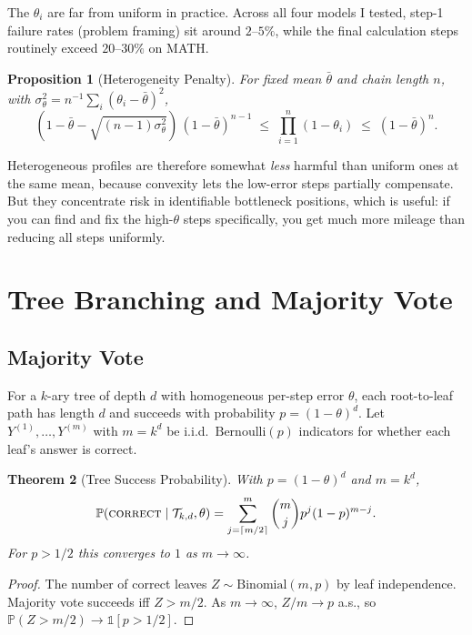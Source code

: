 \documentclass[11pt]{article}
\theoremstyle{plain}
\newtheorem{theorem}{Theorem}[section]
\newtheorem{proposition}[theorem]{Proposition}
\theoremstyle{definition}
\newcommand{\Prob}{\mathbb{P}}
\newcommand{\tree}{\mathcal{T}}
\newcommand{\correct}{\textsc{correct}}
\begin{document}
The $\theta_i$ are far from uniform in practice. Across all four models I
tested, step-1 failure rates (problem framing) sit around $2$--$5\%$, while
the final calculation steps routinely exceed $20$--$30\%$ on MATH.

\begin{proposition}[Heterogeneity Penalty]\label{prop:hetero}
  For fixed mean $\bar\theta$ and chain length $n$, with
  $\sigma^2_\theta = n^{-1}\sum_i(\theta_i-\bar\theta)^2$,
  \[
    (1-\bar\theta - \sqrt{(n-1)\sigma^2_\theta})\,(1-\bar\theta)^{n-1}
    \;\leq\;
    \prod_{i=1}^n(1-\theta_i)
    \;\leq\;
    (1-\bar\theta)^n.
  \]
\end{proposition}

Heterogeneous profiles are therefore somewhat \emph{less} harmful than uniform
ones at the same mean, because convexity lets the low-error steps partially
compensate. But they concentrate risk in identifiable bottleneck positions,
which is useful: if you can find and fix the high-$\theta$ steps specifically,
you get much more mileage than reducing all steps uniformly.

\section{Tree Branching and Majority Vote}
\label{sec:trees}

\subsection{Majority Vote}

For a $k$-ary tree of depth $d$ with homogeneous per-step error $\theta$,
each root-to-leaf path has length $d$ and succeeds with probability
$p = (1-\theta)^d$. Let $Y^{(1)},\ldots,Y^{(m)}$ with $m=k^d$ be
i.i.d.\ $\mathrm{Bernoulli}(p)$ indicators for whether each leaf's answer
is correct.

\begin{theorem}[Tree Success Probability]\label{thm:tree}
  With $p = (1-\theta)^d$ and $m = k^d$,
  \[
    \Prob(\correct \mid \tree_{k,d}, \theta)
    = \sum_{j=\lceil m/2 \rceil}^{m} \binom{m}{j} p^j(1-p)^{m-j}.
  \]
  For $p > 1/2$ this converges to $1$ as $m \to \infty$.
\end{theorem}

\begin{proof}
  The number of correct leaves $Z \sim \mathrm{Binomial}(m,p)$ by leaf
  independence. Majority vote succeeds iff $Z > m/2$. As $m\to\infty$,
  $Z/m \to p$ a.s., so $\Prob(Z > m/2) \to \mathds{1}[p > 1/2]$.
\end{proof}
\end{document}
